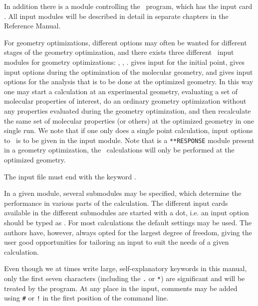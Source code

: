 \begin{list}{}{}
\item {}
\item {}
\item {}
\item {}
\end{list}

In addition there is a module controlling the \siraba\ program, which
has the input card . All
input modules will be described in detail in separate chapters in the
Reference Manual.

For geometry optimizations,
different options may often be wanted for different stages of the
geometry optimization, and there exists three different \aba\ input
modules for geometry optimizations: , ,
.  gives input for the initial point,
 gives input options during the optimization of the
molecular geometry, and  gives input options for the
analysis that is to be done at the optimized geometry. In this way one
may start a calculation at an experimental geometry, evaluating a set
of molecular properties of interest, do an ordinary geometry
optimization without any properties evaluated during the geometry
optimization, and then recalculate the same set of molecular
properties (or others) at the optimized geometry in one single run. We
note that if one only does a single point calculation, input
options to \aba\ is to be given in the  input
module. Note that is a \verb|**RESPONSE| module present in a geometry optimization, the \resp\ calculations will only be performed at the optimized geometry.

The input file must end with the keyword .

In a given module, several submodules may be
specified, which determine the performance in various parts of the
calculation. The different input cards available
in the different submodules are started with a dot, i.e. an input
option should be typed as . For most calculations the
default settings may be used. The authors have, however, always
opted for the largest degree of freedom, giving the user good
opportunities for tailoring an input to suit the needs of a given
calculation.

Even though we at times write large, self-explanatory keywords in this
manual, only the first seven characters (including the \verb|.| or
\verb|*|) are significant and will be
treated by the program. At any
place in the input, comments may be added using
\verb|#| or \verb|!|
in the first position of the command line.

